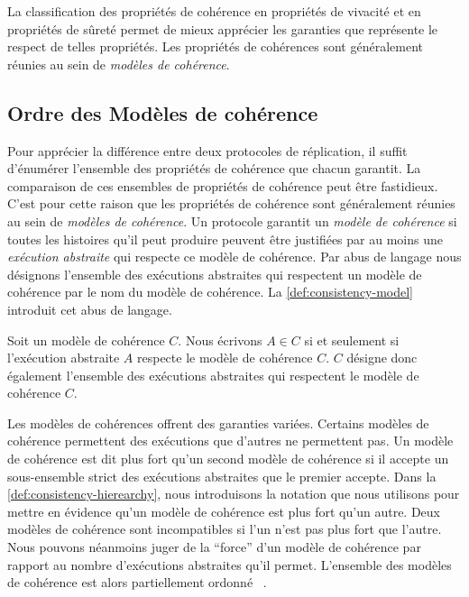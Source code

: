 La classification des propriétés de cohérence en propriétés de vivacité et en propriétés de sûreté permet de mieux apprécier les garanties que représente le respect de telles propriétés.
Les propriétés de cohérences sont généralement réunies au sein de \emph{modèles de cohérence}.

\subsection{Ordre des Modèles de cohérence}\label{subsec:consistency-spec-hier}

Pour apprécier la différence entre deux protocoles de réplication, il suffit d'énumérer l'ensemble des propriétés de cohérence que chacun garantit.
La comparaison de ces ensembles de propriétés de cohérence peut être fastidieux.
C'est pour cette raison que les propriétés de cohérence sont généralement réunies au sein de \emph{modèles de cohérence}.
Un protocole garantit un \emph{modèle de cohérence} si toutes les histoires qu'il peut produire peuvent être justifiées par au moins une \emph{exécution abstraite} qui respecte ce modèle de cohérence.
Par abus de langage nous désignons l'ensemble des exécutions abstraites qui respectent un modèle de cohérence par le nom du modèle de cohérence.
La \autoref{def:consistency-model} introduit cet abus de langage.

\begin{definition}\label{def:consistency-model}
Soit un modèle de cohérence $C$.
Nous écrivons $A \in C$ si et seulement si l'exécution abstraite $A$ respecte le modèle de cohérence $C$.
$C$ désigne donc également l'ensemble des exécutions abstraites qui respectent le modèle de cohérence $C$.
\end{definition}


Les modèles de cohérences offrent des garanties variées.
Certains modèles de cohérence permettent des exécutions que d'autres ne permettent pas.
Un modèle de cohérence est dit plus fort qu'un second modèle de cohérence si il accepte un sous-ensemble strict des exécutions abstraites que le premier accepte.
Dans la \autoref{def:consistency-hierearchy}, nous introduisons la notation que nous utilisons pour mettre en évidence qu'un modèle de cohérence est plus fort qu'un autre.
Deux modèles de cohérence sont incompatibles si l'un n'est pas plus fort que l'autre.
Nous pouvons néanmoins juger de la \enquote{force} d'un modèle de cohérence par rapport au nombre d'exécutions abstraites qu'il permet.
L'ensemble des modèles de cohérence est alors partiellement ordonné
~\autocite{viotti_consistency_2016}.

